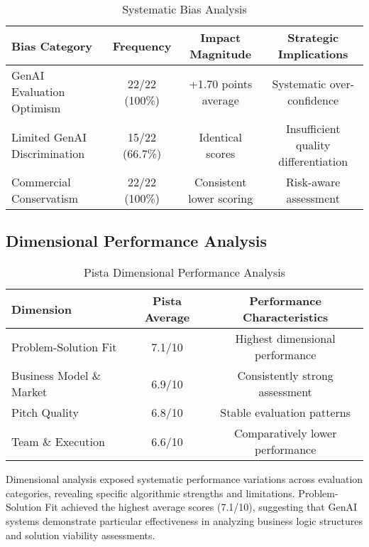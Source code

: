 \begin{table}[ht]
    \centering
    \caption{Systematic Bias Analysis}
    \label{tab:bias-analysis}
    \begin{tabular}{lccc}
        \toprule
        \textbf{Bias Category} & \textbf{Frequency} & \textbf{Impact Magnitude} & \textbf{Strategic Implications} \\
        \midrule
        GenAI Evaluation Optimism & 22/22 (100\%) & +1.70 points average & Systematic over-confidence \\
        Limited GenAI Discrimination & 15/22 (66.7\%) & Identical scores & Insufficient quality differentiation \\
        Commercial Conservatism & 22/22 (100\%) & Consistent lower scoring & Risk-aware assessment \\
        \bottomrule
    \end{tabular}
\end{table}

\subsection{Dimensional Performance Analysis}
\label{subsec:dimensional}

\begin{table}[ht]
    \centering
    \caption{Pista Dimensional Performance Analysis}
    \label{tab:dimensional-analysis}
    \begin{tabular}{lcc}
        \toprule
        \textbf{Dimension} & \textbf{Pista Average} & \textbf{Performance Characteristics} \\
        \midrule
        Problem-Solution Fit & 7.1/10 & Highest dimensional performance \\
        Business Model \& Market & 6.9/10 & Consistently strong assessment \\
        Pitch Quality & 6.8/10 & Stable evaluation patterns \\
        Team \& Execution & 6.6/10 & Comparatively lower performance \\
        \bottomrule
    \end{tabular}
\end{table}

Dimensional analysis exposed systematic performance variations across evaluation categories, revealing specific algorithmic strengths and limitations. Problem-Solution Fit achieved the highest average scores (7.1/10), suggesting that GenAI systems demonstrate particular effectiveness in analyzing business logic structures and solution viability assessments.

